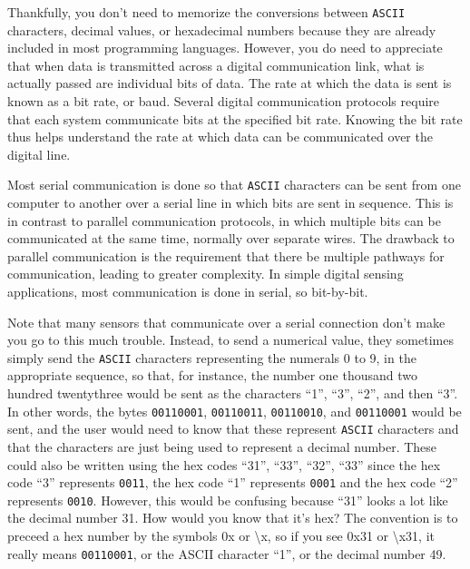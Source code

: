 Thankfully, you don’t need to memorize the conversions between \texttt{ASCII} characters, decimal values, or hexadecimal numbers because they are already included in most programming languages.
However, you do need to appreciate that when data is transmitted across a digital communication link, what is actually passed are individual bits of data. 
The rate at which the data is sent is known as a bit rate, or baud.  
Several digital communication protocols require that each system communicate bits at the specified bit rate. 
Knowing the bit rate thus helps understand the rate at which data can be communicated over the digital line. 

Most serial communication is done so that \texttt{ASCII} characters can be sent from one computer to another over a serial line in which bits are sent in sequence. 
This is in contrast to parallel communication protocols, in which multiple bits can be communicated at the same time, normally over separate wires.
The drawback to parallel communication is the requirement that there be multiple pathways for communication, leading to greater complexity.
In simple digital sensing applications, most communication is done in serial, so bit-by-bit.

Note that many sensors that communicate over a serial connection don’t make you go to this much trouble.
Instead, to send a numerical value, they sometimes simply send the \texttt{ASCII} characters representing the numerals 0 to 9, in the appropriate sequence, so that, for instance, the number one thousand two hundred twentythree would be sent as the characters “1”, “3”, “2”, and then “3”.
In other words, the bytes \texttt{00110001}, \texttt{00110011}, \texttt{00110010}, and \texttt{00110001} would be sent, and the user would need to know that these represent \texttt{ASCII} characters and that the characters are just being used to represent a decimal number.
These could also be written using the hex codes “31”, “33”, “32”, “33” since the hex code “3” represents \texttt{0011}, the hex code “1” represents \texttt{0001} and the hex code “2” represents  \texttt{0010}.  
However, this would be confusing because “31” looks a lot like the decimal number 31.
How would you know that it’s hex?
The convention is to preceed a hex number by the symbols 0x or \textbackslash x, so if you see 0x31 or \textbackslash x31, it really means \texttt{00110001}, or the ASCII character “1”, or the decimal number 49.  

